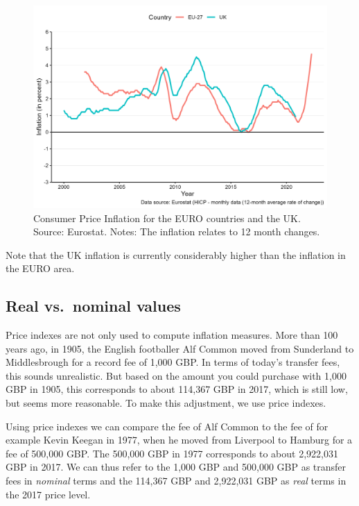 \documentclass[
]{book}
\begin{document}
\begin{figure}

{\centering \includegraphics[width=0.75\linewidth]{./resources/chapter_prices/ex1_2} 

}

\caption{Consumer Price Inflation for the EURO countries and the UK. {Source: Eurostat. Notes: The inflation relates to 12 month changes.}}\label{fig:pricefig2}
\end{figure}

Note that the UK inflation is currently considerably higher than the inflation in the EURO area.

\hypertarget{real-vs.-nominal-values}{%
\subsection*{Real vs.~nominal values}\label{real-vs.-nominal-values}}

Price indexes are not only used to compute inflation measures. More than 100 years ago, in 1905, the English footballer Alf Common moved from Sunderland to Middlesbrough for a record fee of 1,000 GBP. In terms of today's transfer fees, this sounds unrealistic. But based on the amount you could purchase with 1,000 GBP in 1905, this corresponds to about 114,367 GBP in 2017, which is still low, but seems more reasonable. To make this adjustment, we use price indexes.

Using price indexes we can compare the fee of Alf Common to the fee of for example Kevin Keegan in 1977, when he moved from Liverpool to Hamburg for a fee of 500,000 GBP. The 500,000 GBP in 1977 corresponds to about 2,922,031 GBP in 2017. We can thus refer to the 1,000 GBP and 500,000 GBP as transfer fees in \emph{nominal} terms and the 114,367 GBP and 2,922,031 GBP as \emph{real} terms in the 2017 price level.
\end{document}
